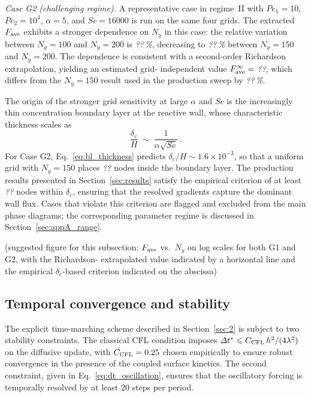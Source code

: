 \documentclass[lineno]{JFM-FLM_Au}
\begin{document}
\medskip
\noindent\textit{Case G2 (challenging regime).}
A representative case in regime~II with $Pe_{1} = 10$, $Pe_{2} = 10^{4}$,
$\alpha = 5$, and $Sc = 16000$ is run on the same four grids. The
extracted $F_{\rm ave}$ exhibits a stronger dependence on $N_{y}$ in
this case: the relative variation between $N_{y} = 100$ and
$N_{y} = 200$ is \textit{??\,\%}, decreasing to \textit{??\,\%} between
$N_{y} = 150$ and $N_{y} = 200$. The dependence is consistent with a
second-order Richardson extrapolation, yielding an estimated grid-
independent value $F_{\rm ave}^{\infty} = $ \textit{??}, which differs
from the $N_{y} = 150$ result used in the production sweep by
\textit{??\,\%}.
 
The origin of the stronger grid sensitivity at large $\alpha$ and
$Sc$ is the increasingly thin concentration boundary layer at the
reactive wall, whose characteristic thickness scales as
\begin{equation}
\frac{\delta_{c}}{H} \;\sim\; \frac{1}{\alpha \sqrt{Sc}}\,.
\label{eq:bl_thickness}
\end{equation}
For Case G2, Eq.~\eqref{eq:bl_thickness} predicts
$\delta_{c}/H \sim 1.6 \times 10^{-3}$, so that a uniform grid with
$N_{y} = 150$ places \textit{??} nodes inside the boundary layer. The
production results presented in Section~\ref{sec:results} satisfy the
empirical criterion of at least \textit{??} nodes within
$\delta_{c}$, ensuring that the resolved gradients capture the dominant
wall flux. Cases that violate this criterion are flagged and excluded
from the main phase diagrams; the corresponding parameter regime is
discussed in Section~\ref{sec:appA_range}.
 
\medskip
\noindent
{\color{magenta}(suggested figure for this subsection: $F_{\rm ave}$
vs.~$N_{y}$ on log scales for both G1 and G2, with the Richardson-
extrapolated value indicated by a horizontal line and the empirical
$\delta_{c}$-based criterion indicated on the abscissa)}
 
\subsection{Temporal convergence and stability}
\label{sec:appA_time}
 
The explicit time-marching scheme described in
Section~\ref{sec:2} is subject to two stability constraints. The
classical CFL condition imposes
$\Delta t^{*} \le C_{\rm CFL}\, h^{2}/(4\lambda^{2})$ on the diffusive
update, with $C_{\rm CFL} = 0.25$ chosen empirically to ensure robust
convergence in the presence of the coupled surface kinetics. The second
constraint, given in Eq.~\eqref{eq:dt_oscillation}, ensures that the
oscillatory forcing is temporally resolved by at least 20 steps per
period.
 
\end{document}
